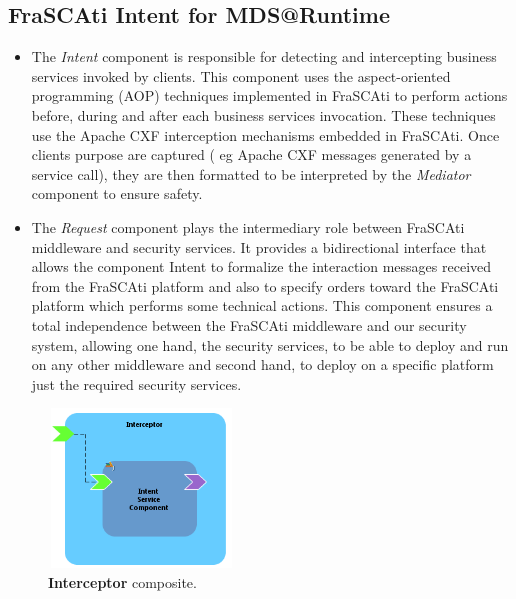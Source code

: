 \documentclass[runningheads,a4paper]{llncs}
\begin{document}
\subsection{FraSCAti Intent for MDS@Runtime}
\begin{itemize}
\settowidth{\leftmargin}{{\Large$\square$}}\advance\leftmargin{}
\itemsep8pt\relax
\renewcommand\labelitemi{{\lower1.5pt\hbox{\Large$\square$}}}
\item The \emph{Intent} component is responsible for detecting and intercepting business services invoked  by clients. This component uses the aspect-oriented programming (AOP) techniques implemented in FraSCAti to perform actions before, during and after each business services invocation. These techniques use the Apache CXF interception mechanisms embedded in FraSCAti. Once clients purpose are captured ( eg Apache CXF messages generated by a service call), they are then formatted to be interpreted by the \emph{Mediator} component to ensure safety.
\item The \emph{Request} component plays the intermediary role between FraSCAti middleware and security services. It provides a bidirectional interface that allows the component Intent to formalize the interaction messages received from the FraSCAti platform and also to specify orders toward the FraSCAti platform which performs some technical actions. This component ensures a total independence between the FraSCAti middleware and our security system, allowing one hand, the security services,  to be able to deploy and run on any other middleware and second hand, to deploy on a specific platform just the required security services.
\end{itemize}
\begin{figure}[ht]  
\centering
\includegraphics[height=120pt, width=140pt]{interceptorComponent1.png}
\caption{\textbf{Interceptor} composite.}
\label{fig:interceptor}
\end{figure}
\end{document}
